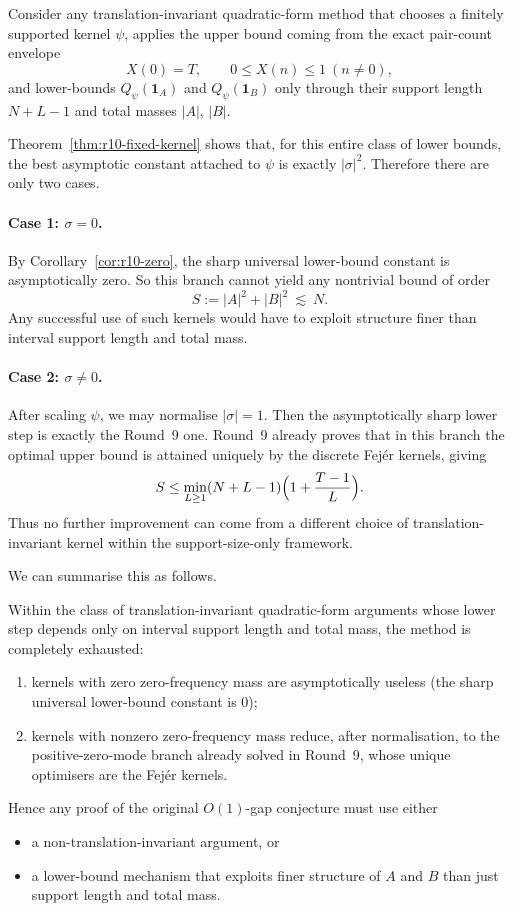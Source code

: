 Consider any translation-invariant quadratic-form method that chooses a finitely supported kernel \(\psi\), applies the upper bound coming from the exact pair-count envelope
\[
X(0)=T,
\qquad
0\le X(n)\le 1\ (n\ne 0),
\]
and lower-bounds \(Q_\psi(\mathbf 1_A)\) and \(Q_\psi(\mathbf 1_B)\) only through their support length \(N+L-1\) and total masses \(|A|\), \(|B|\).

Theorem~\ref{thm:r10-fixed-kernel} shows that, for this entire class of lower bounds, the best asymptotic constant attached to \(\psi\) is exactly \(|\sigma|^2\). Therefore there are only two cases.

\paragraph{Case 1: \(\sigma=0\).}
By Corollary~\ref{cor:r10-zero}, the sharp universal lower-bound constant is asymptotically zero. So this branch cannot yield any nontrivial bound of order
\[
S:=|A|^2+|B|^2\ \lesssim\ N.
\]
Any successful use of such kernels would have to exploit structure finer than interval support length and total mass.

\paragraph{Case 2: \(\sigma\ne 0\).}
After scaling \(\psi\), we may normalise \(|\sigma|=1\). Then the asymptotically sharp lower step is exactly the Round~9 one. Round~9 already proves that in this branch the optimal upper bound is attained uniquely by the discrete Fej\'er kernels, giving
\[
S\le \min_{L\ge 1}(N+L-1)\Bigl(1+\frac{T-1}{L}\Bigr).
\]
Thus no further improvement can come from a different choice of translation-invariant kernel within the support-size-only framework.

We can summarise this as follows.

\begin{theorem}
\label{thm:r10-dichotomy}
Within the class of translation-invariant quadratic-form arguments whose lower step depends only on interval support length and total mass, the method is completely exhausted:
\begin{enumerate}
\item kernels with zero zero-frequency mass are asymptotically useless (the sharp universal lower-bound constant is \(0\));
\item kernels with nonzero zero-frequency mass reduce, after normalisation, to the positive-zero-mode branch already solved in Round~9, whose unique optimisers are the Fej\'er kernels.
\end{enumerate}
Hence any proof of the original \(O(1)\)-gap conjecture must use either
\begin{itemize}
\item a non-translation-invariant argument, or
\item a lower-bound mechanism that exploits finer structure of \(A\) and \(B\) than just support length and total mass.
\end{itemize}
\end{theorem}

